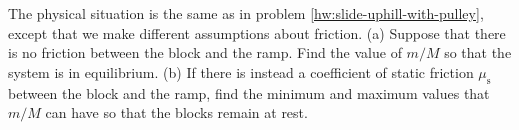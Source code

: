 The physical situation is the same as in problem \ref{hw:slide-uphill-with-pulley},
except that we make different assumptions about friction.
%
(a) Suppose that there is no friction between the block and the ramp.
Find the value of $m/M$ so that the system is in equilibrium.\answercheck\hwendpart
%
(b) If there is instead a coefficient of static friction $\mu_\text{s}$
between the block and the ramp, find the minimum and maximum
values that $m/M$ can have so that the blocks remain at rest.\answercheck
